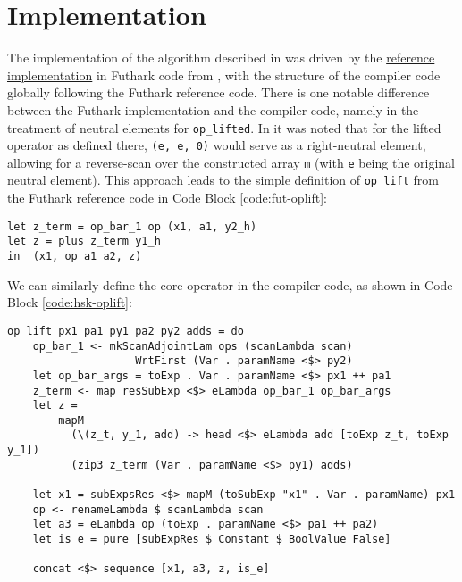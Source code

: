 \documentclass{article}
\newenvironment{code}{\captionsetup{type=listing}}{}
\begin{document}
\section{Implementation}
The implementation of the algorithm described in \cite{PPAD} was driven by the \href{https://github.com/diku-dk/ifl23-revad-red-scan/blob/main/scan/scan-adj-comp.fut}{reference implementation} in Futhark code from \cite{Futhark}, with the structure of the compiler code globally following the Futhark reference code. There is one notable difference between the Futhark implementation and the compiler code, namely in the treatment of neutral elements for \lstinline{op_lifted}. In \cite{PPAD} it was noted that for the lifted operator as defined there, \lstinline{(e, e, 0)} would serve as a right-neutral element, allowing for a reverse-scan over the constructed array \lstinline{m} (with \lstinline{e} being the original neutral element). This approach leads to the simple definition of \lstinline{op_lift} from the Futhark reference code in Code Block \ref{code:fut-oplift}:
\begin{code}
	\begin{verbatim}
let z_term = op_bar_1 op (x1, a1, y2_h)
let z = plus z_term y1_h
in  (x1, op a1 a2, z)
\end{verbatim}
	\caption{Reference Futhark code for \lstinline{op_lift} (operator for scan calculating adjoints for scan intermediates rs/xs). \lstinline{op_bar_1} refers to differentiating \lstinline{op} with respect to its first argument.\\}
	\label{code:fut-oplift}
\end{code}
We can similarly define the core operator in the compiler code, as shown in Code Block \ref{code:hsk-oplift}:
\begin{code}
	\begin{verbatim}
op_lift px1 pa1 py1 pa2 py2 adds = do
    op_bar_1 <- mkScanAdjointLam ops (scanLambda scan) 
                    WrtFirst (Var . paramName <$> py2)
    let op_bar_args = toExp . Var . paramName <$> px1 ++ pa1
    z_term <- map resSubExp <$> eLambda op_bar_1 op_bar_args
    let z =
        mapM
          (\(z_t, y_1, add) -> head <$> eLambda add [toExp z_t, toExp y_1])
          (zip3 z_term (Var . paramName <$> py1) adds)
    
    let x1 = subExpsRes <$> mapM (toSubExp "x1" . Var . paramName) px1
    op <- renameLambda $ scanLambda scan
    let a3 = eLambda op (toExp . paramName <$> pa1 ++ pa2)
    let is_e = pure [subExpRes $ Constant $ BoolValue False]
    
    concat <$> sequence [x1, a3, z, is_e]
\end{verbatim}
\caption{Haskell code for \lstinline{op_lift} (operator for scan calculating adjoints for scan intermediates rs/xs).\\}
\label{code:hsk-oplift}
\end{code}
\end{document}
